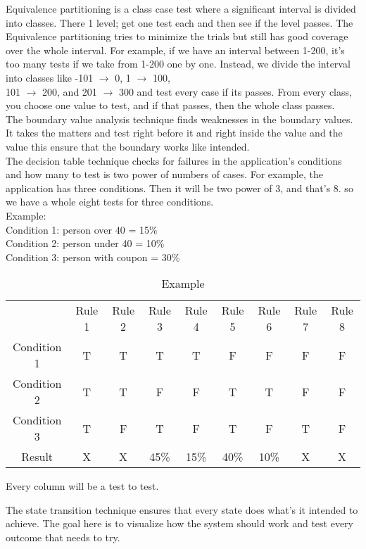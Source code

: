 \documentclass{article}
\begin{document}
Equivalence partitioning is a class case test where a significant interval is divided into classes. There 1 level; get one test each and then see if the level passes. The Equivalence partitioning tries to minimize the trials but still has good coverage over the whole interval. For example, if we have an interval between 1-200, it's too many tests if we take from 1-200 one by one.
Instead, we divide the interval into classes like -101 $\rightarrow$ 0, 1 $\rightarrow$ 100,\\101 $\rightarrow$ 200, and 201 $\rightarrow$ 300 and test every case if its passes. From every class, you choose one value to test, and if that passes, then the whole class passes.\\

The boundary value analysis technique finds weaknesses in the boundary values. It takes the matters and test right before it and right inside the value and the value this ensure that the boundary works like intended.\\

The decision table technique checks for failures in the application's conditions and how many to test is two power of numbers of cases. For example, the application has three conditions. Then it will be two power of 3, and that's 8. so we have a whole eight tests for three conditions. \\
Example:\\ 
Condition 1: person over 40 = 15\%\\
Condition 2: person under 40 = 10\%\\
Condition 3: person with coupon = 30\%\\
\begin{table}[h!]
    \centering
    \begin{tabular}{c|c|c|c|c|c|c|c|c|}
        &Rule 1&Rule 2&Rule 3&Rule 4&Rule 5&Rule 6&Rule 7&Rule 8  \\
        Condition 1&T&T&T&T&F&F&F&F\\
        Condition 2&T&T&F&F&T&T&F&F\\
        Condition 3&T&F&T&F&T&F&T&F\\
        Result&X&X&45\%&15\%&40\%&10\%&X&X\\
        
    \end{tabular}
    \caption{Example}
    \label{tab:my_label}
\end{table}
Every column will be a test to test.

The state transition technique ensures that every state does what's it intended to achieve. The goal here is to visualize how the system should work and test every outcome that needs to try.
\end{document}
